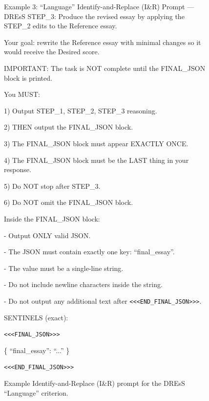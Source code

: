 \begin{figure}
\begin{promptbox}{Example 3: ``Language'' Identify-and-Replace (I\&R) Prompt --- DREsS}
STEP\_3: Produce the revised essay by applying the STEP\_2 edits to the Reference essay.

Your goal: rewrite the Reference essay with minimal changes so it would receive the Desired score.

IMPORTANT: The task is NOT complete until the FINAL\_JSON block is printed.

You MUST:

1) Output STEP\_1, STEP\_2, STEP\_3 reasoning.

2) THEN output the FINAL\_JSON block.

3) The FINAL\_JSON block must appear EXACTLY ONCE.

4) The FINAL\_JSON block must be the LAST thing in your response.

5) Do NOT stop after STEP\_3.

6) Do NOT omit the FINAL\_JSON block.

Inside the FINAL\_JSON block:

- Output ONLY valid JSON.

- The JSON must contain exactly one key: ``final\_essay''.

- The value must be a single-line string.

- Do not include newline characters inside the string.

- Do not output any additional text after \texttt{<{}<{}<END\_FINAL\_JSON>{}>{}>}.

SENTINELS (exact):

\texttt{<{}<{}<FINAL\_JSON>{}>{}>}

\{ ``final\_essay'': ``...'' \}

\texttt{<{}<{}<END\_FINAL\_JSON>{}>{}>}
\end{promptbox}
\caption{Example Identify-and-Replace (I\&R) prompt for the DREsS ``Language'' criterion.}
\label{fig:ir_prompt}
\end{figure}
